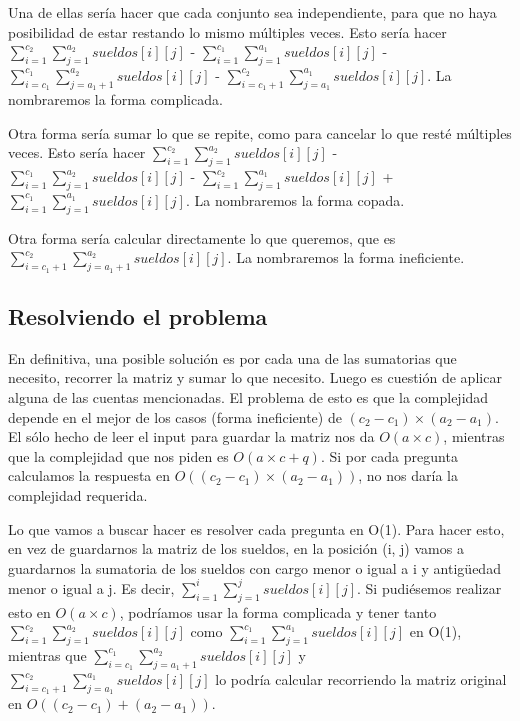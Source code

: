 Una de ellas sería hacer que cada conjunto sea independiente, para que no haya posibilidad de estar restando lo mismo múltiples veces. Esto sería hacer $\sum_{i = 1}^{c_2} \sum_{j = 1}^{a_2} sueldos[i][j]$ - $\sum_{i = 1}^{c_1} \sum_{j = 1}^{a_1} sueldos[i][j]$ - $\sum_{i = c_1}^{c_1} \sum_{j = a_1 + 1}^{a_2} sueldos[i][j]$ - $\sum_{i = c_1 + 1}^{c_2} \sum_{j = a_1}^{a_1} sueldos[i][j]$. La nombraremos la forma complicada.  \newline

Otra forma sería sumar lo que se repite, como para cancelar lo que resté múltiples veces. Esto sería hacer $\sum_{i = 1}^{c_2} \sum_{j = 1}^{a_2} sueldos[i][j]$ - $\sum_{i = 1}^{c_1} \sum_{j = 1}^{a_2} sueldos[i][j]$ - $\sum_{i = 1}^{c_2} \sum_{j = 1}^{a_1} sueldos[i][j]$ + $\sum_{i = 1}^{c_1} \sum_{j = 1}^{a_1} sueldos[i][j]$. La nombraremos la forma copada.  \newline

Otra forma sería calcular directamente lo que queremos, que es $\sum_{i = c_1 + 1}^{c_2} \sum_{j = a_1 + 1}^{a_2} sueldos[i][j]$. La nombraremos la forma ineficiente.

\subsection{Resolviendo el problema}

En definitiva, una posible solución es por cada una de las sumatorias que necesito, recorrer la matriz y sumar lo que necesito. Luego es cuestión de aplicar alguna de las cuentas mencionadas. El problema de esto es que la complejidad depende en el mejor de los casos (forma ineficiente) de $(c_2 - c_1) \times (a_2 - a_1)$. El sólo hecho de leer el input para guardar la matriz nos da $O(a \times c)$, mientras que la complejidad que nos piden es $O(a \times c + q)$. Si por cada pregunta calculamos la respuesta en $O((c_2 - c_1) \times (a_2 - a_1))$, no nos daría la complejidad requerida.  \newline

Lo que vamos a buscar hacer es resolver cada pregunta en O(1). Para hacer esto, en vez de guardarnos la matriz de los sueldos, en la posición (i, j) vamos a guardarnos la sumatoria de los sueldos con cargo menor o igual a i y antigüedad menor o igual a j. Es decir, $\sum_{i = 1}^{i} \sum_{j = 1}^{j} sueldos[i][j]$. Si pudiésemos realizar esto en $O(a \times c)$, podríamos usar la forma complicada y tener tanto $\sum_{i = 1}^{c_2} \sum_{j = 1}^{a_2} sueldos[i][j]$ como $\sum_{i = 1}^{c_1} \sum_{j = 1}^{a_1} sueldos[i][j]$ en O(1), mientras que $\sum_{i = c_1}^{c_1} \sum_{j = a_1 + 1}^{a_2} sueldos[i][j]$ y $\sum_{i = c_1 + 1}^{c_2} \sum_{j = a_1}^{a_1} sueldos[i][j]$ lo podría calcular recorriendo la matriz original en $O((c_2 - c_1) + (a_2 - a_1))$.  \newline


